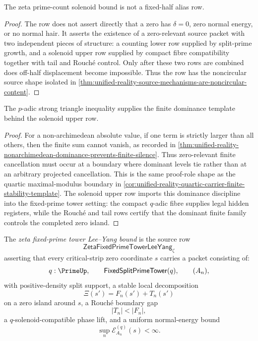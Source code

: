 \begin{corollary}
\label{cor:unified-reality-prime-count-solenoid-row-source-theorem}
The zeta prime-count solenoid bound is not a fixed-half alias row.
\end{corollary}

\begin{proof}
The row does not assert directly that a zero has $\delta=0$, zero normal
energy, or no normal hair.  It asserts the existence of a zero-relevant
source packet with two independent pieces of structure: a counting lower
row supplied by split-prime growth, and a solenoid upper row supplied by
compact fibre compatibility together with tail and Rouch\'e control.
Only after these two rows are combined does off-half displacement become
impossible.  Thus the row has the noncircular source shape isolated in
\autoref{thm:unified-reality-source-mechanisms-are-noncircular-content}.
\end{proof}

\begin{corollary}
\label{cor:unified-reality-strong-triangle-dominance-explains-upper-row}
The $p$-adic strong triangle inequality supplies the finite dominance
template behind the solenoid upper row.
\end{corollary}

\begin{proof}
For a non-archimedean absolute value, if one term is strictly larger
than all others, then the finite sum cannot vanish, as recorded in
\autoref{thm:unified-reality-nonarchimedean-dominance-prevents-finite-silence}.
Thus zero-relevant finite cancellation must occur at a boundary where
dominant levels tie rather than at an arbitrary projected cancellation.
This is the same proof-role shape as the quartic maximal-modulus
boundary in
\autoref{cor:unified-reality-quartic-carrier-finite-stability-template}.
The solenoid upper row imports this dominance discipline into the
fixed-prime tower setting: the compact $q$-adic fibre supplies legal
hidden registers, while the Rouch\'e and tail rows certify that the
dominant finite family controls the completed zero island.
\end{proof}

\begin{definition}
\label{def:unified-reality-zeta-fixed-prime-tower-lee-yang-bound}
The \emph{zeta fixed-prime tower Lee--Yang bound} is the source row
$$
\mathsf{ZetaFixedPrimeTowerLeeYang}_{\zeta}
$$
asserting that every critical-strip zero coordinate $s$ carries a packet
consisting of:
$$
q:\PrimeUp,
\qquad
\mathsf{FixedSplitPrimeTower}(q),
\qquad
(A_n),
$$
with positive-density split support, a stable local decomposition
$$
\Xi(s')=F_n(s')+T_n(s')
$$
on a zero island around $s$, a Rouch\'e boundary gap
$$
|T_n|<|F_n|,
$$
a $q$-solenoid-compatible phase lift, and a uniform normal-energy bound
$$
\sup_n\mathcal E_{A_n}^{(q)}(s)<\infty.
$$
\end{definition}


